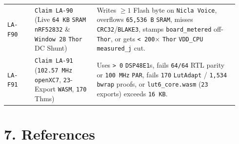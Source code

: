 \documentclass[10pt]{article}
\begin{document}
{\begin{longtable}{@{}L{0.11\linewidth}L{0.25\linewidth}L{0.58\linewidth}@{}}
\texttt{LA-F90} & \texttt{Claim LA-90} (Live \texttt{64 KB} \texttt{SRAM} \texttt{nRF52832} \& \texttt{Window 28} \texttt{Thor} DC Shunt) & Writes $\ge 1$ Flash byte on \texttt{Nicla Voice}, overflows \texttt{65,536 B} \texttt{SRAM}, misses \texttt{CRC32}/\texttt{BLAKE3}, stamps \texttt{board\_metered} off-\texttt{Thor}, or gets \texttt{< 200$\times$} \texttt{Thor} \texttt{VDD\_CPU} \texttt{measured\_j} cut. \\
\texttt{LA-F91} & \texttt{Claim LA-91} (\texttt{102.57 MHz openXC7}, \texttt{23}-Export \texttt{WASM}, \texttt{170} Thms) & Uses \texttt{> 0} \texttt{DSP48E1}s, fails \texttt{64/64} RTL parity or \texttt{100 MHz} \texttt{PAR}, fails \texttt{170} \texttt{LutAdapt} / \texttt{1,534} \texttt{bwrap} proofs, or \texttt{lut6\_core.wasm} (\texttt{23} exports) exceeds \texttt{16 KB}. \\
\bottomrule
\end{longtable}
}

\section{7. References}\label{references}
\end{document}
